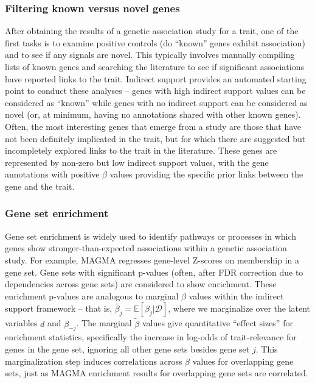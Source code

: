 \documentclass[11pt]{article}
\begin{document}
\subsubsection{Filtering known versus novel genes}
After obtaining the results of a genetic association study for a trait, one of the
first tasks is to examine positive controls (do ``known'' genes
exhibit association) and to see if any signals are novel. This
typically involves manually compiling lists of known genes and
searching the literature to see if significant associations have
reported links to the trait. Indirect support provides an
automated starting point to conduct these analyses -- genes with high
indirect support values can be considered as ``known'' while genes
with no indirect support can be considered as novel (or, at minimum,
having no annotations shared with other known genes). Often, the most
interesting genes that emerge from a study are those that have not
been definitely implicated in the trait, but for which there are
suggested but incompletely explored links to the trait in the
literature. These genes are represented by non-zero but low indirect
support values, with the gene annotations with positive $\beta$ values
providing the specific prior links between the gene and the trait.

\subsubsection{Gene set enrichment}
Gene set enrichment is widely used to identify pathways or processes
in which genes show stronger-than-expected associations within a
genetic association study. For example, MAGMA regresses gene-level
Z-scores on membership in a gene set. Gene sets with significant
p-values (often, after FDR correction due to dependencies across gene
sets) are considered to show enrichment. These enrichment p-values are
analogous to marginal $\beta$ values within the indirect support
framework -- that is, $\tilde{\beta_j} = \mathbb{E}\left[\beta_j|\mathcal{D}\right]$, where we
marginalize over the latent variables $d$ and $\beta_{-j}$. The
marginal $\tilde{\beta}$ values give quantitative ``effect sizes'' for
enrichment statistics, specifically the increase in log-odds of
trait-relevance for genes in the gene set, ignoring all other gene
sets besides gene set $j$. This marginalization step induces
correlations across $\beta$ values for overlapping gene sets, just as
MAGMA enrichment results for 
overlapping gene sets are correlated.
\end{document}
